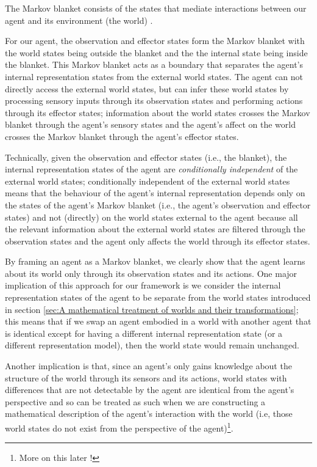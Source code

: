 The Markov blanket consists of the states that mediate interactions between our agent and its environment (the world) \cite{Ramstead2020}.

For our agent, the observation and effector states form the Markov blanket with the world states being outside the blanket and the the internal state being inside the blanket.
This Markov blanket acts as a boundary that separates the agent's internal representation states from the external world states.
The agent can not directly access the external world states, but can infer these world states by processing sensory inputs through its observation states and performing actions through its effector states; information about the world states crosses the Markov blanket through the agent's sensory states and the agent's affect on the world crosses the Markov blanket through the agent's effector states.

Technically, given the observation and effector states (i.e., the blanket), the internal representation states of the agent are \emph{conditionally independent} of the external world states; conditionally independent of the external world states means that the behaviour of the agent's internal representation depends only on the states of the agent's Markov blanket (i.e., the agent's observation and effector states) and not (directly) on the world states external to the agent because all the relevant information about the external world states are filtered through the observation states and the agent only affects the world through its effector states.

By framing an agent as a Markov blanket, we clearly show that the agent learns about its world only through its observation states and its actions.
One major implication of this approach for our framework is we consider the internal representation states of the agent to be separate from the world states introduced in section \ref{sec:A mathematical treatment of worlds and their transformations}; this means that if we swap an agent embodied in a world with another agent that is identical except for having a different internal representation state (or a different representation model), then the world state would remain unchanged.

Another implication is that, since an agent's only gains knowledge about the structure of the world through its sensors and its actions, world states with differences that are not detectable by the agent are identical from the agent's perspective and so can be treated as such when we are constructing a mathematical description of the agent's interaction with the world (i.e, those world states do not exist from the perspective of the agent)\footnote{More on this later !}.

